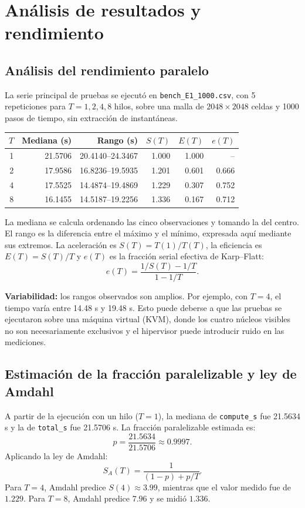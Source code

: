 \documentclass[12pt,a4paper]{article}
\begin{document}
\section{Análisis de resultados y rendimiento}
\subsection{Análisis del rendimiento paralelo}
La serie principal de pruebas se ejecutó en \texttt{bench\_E1\_1000.csv}, con 5 repeticiones para $T=1,2,4,8$ hilos, sobre una malla de $2048\times2048$ celdas y 1000 pasos de tiempo, sin extracción de instantáneas.

\begin{table}[H]
\centering
\begin{tabular}{rrrrrr}\toprule
$T$ & Mediana (s) & Rango (s) & $S(T)$ & $E(T)$ & $e(T)$\\\midrule
1 & 21.5706 & 20.4140--24.3467 & 1.000 & 1.000 & --\\
2 & 17.9586 & 16.8236--19.5935 & 1.201 & 0.601 & 0.666\\
4 & 17.5525 & 14.4874--19.4869 & 1.229 & 0.307 & 0.752\\
8 & 16.1455 & 14.5187--19.2256 & 1.336 & 0.167 & 0.712\\\bottomrule
\end{tabular}
\end{table}

La mediana se calcula ordenando las cinco observaciones y tomando la del centro. El rango es la diferencia entre el máximo y el mínimo, expresada aquí mediante sus extremos. La aceleración es $S(T)=T(1)/T(T)$, la eficiencia es $E(T)=S(T)/T$ y $e(T)$ es la fracción serial efectiva de Karp--Flatt:
\[
e(T)=\frac{1/S(T)-1/T}{1-1/T}.
\]

\textbf{Variabilidad:} los rangos observados son amplios. Por ejemplo, con $T=4$, el tiempo varía entre 14.48 s y 19.48 s. Esto puede deberse a que las pruebas se ejecutaron sobre una máquina virtual (KVM), donde los cuatro núcleos visibles no son necesariamente exclusivos y el hipervisor puede introducir ruido en las mediciones.

\subsection{Estimación de la fracción paralelizable y ley de Amdahl}
A partir de la ejecución con un hilo ($T=1$), la mediana de \texttt{compute\_s} fue 21.5634 s y la de \texttt{total\_s} fue 21.5706 s. La fracción paralelizable estimada es:
\[
p=\frac{21.5634}{21.5706}\approx 0.9997.
\]
Aplicando la ley de Amdahl:
\[
S_A(T)=\frac{1}{(1-p)+p/T}.
\]
Para $T=4$, Amdahl predice $S(4)\approx3.99$, mientras que el valor medido fue de $1.229$. Para $T=8$, Amdahl predice $7.96$ y se midió $1.336$.
\end{document}
